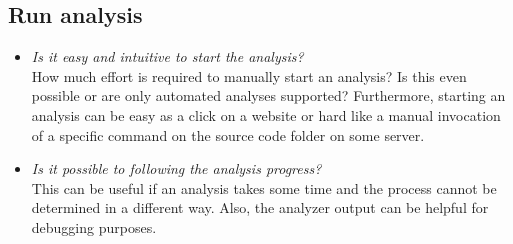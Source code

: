 \documentclass[conference]{IEEEtran}
\begin{document}
\subsection{Run analysis}
\begin{itemize}
	\item \textit{Is it easy and intuitive to start the analysis?} \\
	How much effort is required to manually start an analysis? Is this even possible or are only automated analyses supported? Furthermore, starting an analysis can be easy as a click on a website or hard like a manual invocation of a specific command on the source code folder on some server.
	
	\item \textit{Is it possible to following the analysis progress?} \\
	This can be useful if an analysis takes some time and the process cannot be determined in a different way. Also, the analyzer output can be helpful for debugging purposes.
\end{itemize}
\end{document}
